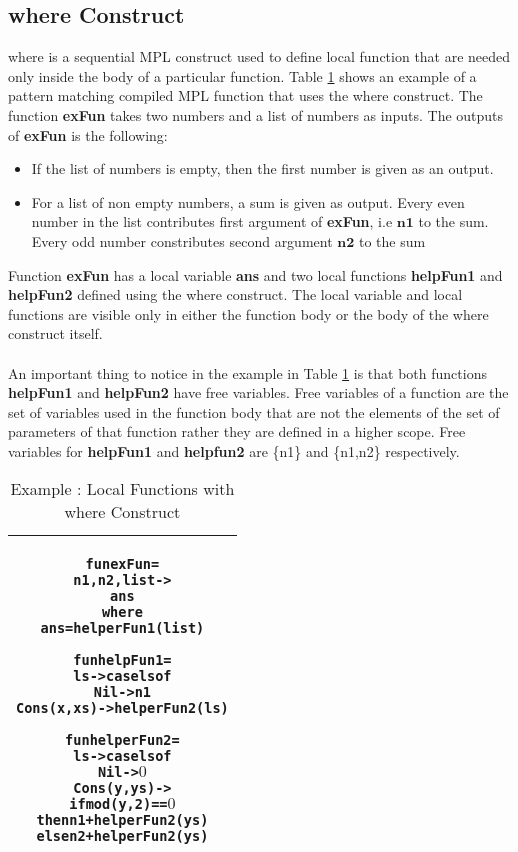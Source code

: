 \documentclass[11pt]{article}
\begin{document}
\subsection {where Construct}\label{lam:whereOverview}
{\sf where} is a sequential MPL construct used to define local function that are needed only inside the body of a particular function. Table \ref {lam:whereExample} shows an example of a pattern matching compiled MPL function that uses the {\sf where} construct. The function {\bf exFun} takes two numbers and a list of numbers as inputs. The outputs of {\bf exFun} is the following:
\begin {itemize}
  \item If the list of numbers is empty, then the first number is given as an output.
  \item For a list of non empty numbers, a sum is given as output. Every even number in the list contributes first argument of {\bf exFun}, i.e $\mathbf{n1}$ to the sum. Every odd number constributes second argument $\mathbf{n2}$ to the sum
\end {itemize}
Function {\bf exFun} has a local variable {\bf ans} and two local functions {\bf helpFun1} and {\bf helpFun2} defined using the {\sf where} construct. The local variable and local functions are visible only in either the function body or the body of the {\sf where} construct itself.
~~\\~~\\ 
An important thing to notice in the example in Table \ref {lam:whereExample} is that both functions {\bf helpFun1} and {\bf helpFun2} have free variables. Free variables of a function are the set of variables used in the function body that are not the elements of the set of parameters of that function rather they are defined in a higher scope. Free variables for {\bf helpFun1} and {\bf helpfun2} are \{n1\} and \{n1,n2\} respectively.
\begin{table}[h!]
\begin{center}
\begin{tabular}{|c|} \hline
\begin{minipage}{3.8in}
\begin{alltt}


  fun exFun = 
      n1,n2,list -> 
           ans
        where
          ans = helperFun1 (list)

          fun helpFun1 = 
              ls -> case ls of 
                      Nil -> n1
                      Cons(x,xs) -> helperFun2(ls)

          fun helperFun2 =
              ls -> case ls of
                      Nil -> \(0\)
                      Cons(y,ys) ->
                        if mod(y,2) == \(0\) 
                          then n1 + helperFun2(ys)
                          else n2 + helperFun2(ys) 

\end{alltt} 
\end {minipage} 
\tabularnewline
\hline
\end{tabular}
\caption{Example : Local Functions with {\sf where} Construct}
\label{lam:whereExample}
\end{center}
\end{table}
\end{document}

